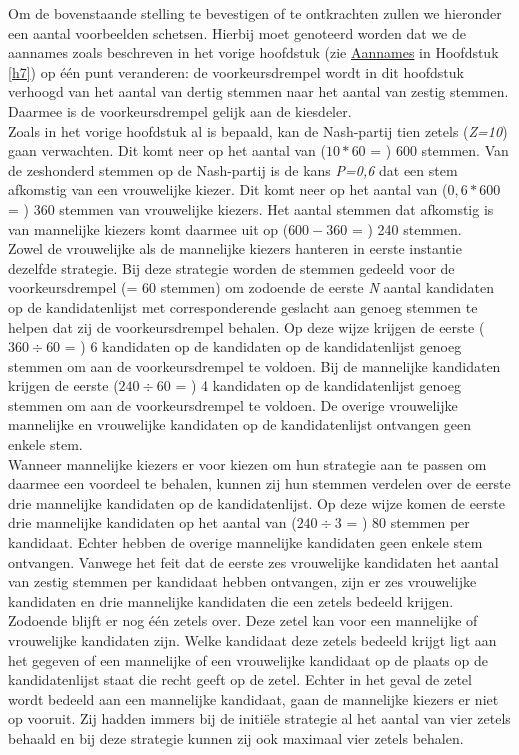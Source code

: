 Om de bovenstaande stelling te bevestigen of te ontkrachten zullen we hieronder een aantal voorbeelden schetsen. Hierbij moet genoteerd worden dat we de aannames zoals beschreven in het vorige hoofdstuk (zie \hyperref[aannamesNash]{Aannames} in Hoofdstuk \ref{h7}) op één punt veranderen: de voorkeursdrempel wordt in dit hoofdstuk verhoogd van het aantal van dertig stemmen naar het aantal van zestig stemmen. Daarmee is de voorkeursdrempel gelijk aan de kiesdeler. \\
\indent Zoals in het vorige hoofdstuk al is bepaald, kan de Nash-partij tien zetels (\textit{Z=10}) gaan verwachten. Dit komt neer op het aantal van ($10*60$ = ) 600 stemmen. Van de zeshonderd stemmen op de Nash-partij is de kans \textit{P=0,6} dat een stem afkomstig van een vrouwelijke kiezer. Dit komt neer op het aantal van ($0,6*600$ = ) 360 stemmen van vrouwelijke kiezers. Het aantal stemmen dat afkomstig is van mannelijke kiezers komt daarmee uit op ($600-360$ = ) 240 stemmen.\\
\indent Zowel de vrouwelijke als de mannelijke kiezers hanteren in eerste instantie dezelfde strategie. Bij deze strategie worden de stemmen gedeeld voor de voorkeursdrempel (= 60 stemmen) om zodoende de eerste \textit{N} aantal kandidaten op de kandidatenlijst met corresponderende geslacht aan genoeg stemmen te helpen dat zij de voorkeursdrempel behalen. Op deze wijze krijgen de eerste ($360\div60$ = ) 6 kandidaten op de kandidaten op de kandidatenlijst genoeg stemmen om aan de voorkeursdrempel te voldoen. Bij de mannelijke kandidaten krijgen de eerste ($240\div60$ = ) 4 kandidaten op de kandidatenlijst genoeg stemmen om aan de voorkeursdrempel te voldoen. De overige vrouwelijke mannelijke en vrouwelijke kandidaten op de kandidatenlijst ontvangen geen enkele stem. \\
\indent Wanneer mannelijke kiezers er voor kiezen om hun strategie aan te passen om daarmee een voordeel te behalen, kunnen zij hun stemmen verdelen over de eerste drie mannelijke kandidaten op de kandidatenlijst. Op deze wijze komen de eerste drie mannelijke kandidaten op het aantal van ($240\div3$ = ) 80 stemmen per kandidaat. Echter hebben de overige mannelijke kandidaten geen enkele stem ontvangen. Vanwege het feit dat de eerste zes vrouwelijke kandidaten het aantal van zestig stemmen per kandidaat hebben ontvangen, zijn er zes vrouwelijke kandidaten en drie mannelijke kandidaten die een zetels bedeeld krijgen. Zodoende blijft er nog één zetels over. Deze zetel kan voor een mannelijke of vrouwelijke kandidaten zijn. Welke kandidaat deze zetels bedeeld krijgt ligt aan het gegeven of een mannelijke of een vrouwelijke kandidaat op de plaats op de kandidatenlijst staat die recht geeft op de zetel. Echter in het geval de zetel wordt bedeeld aan een mannelijke kandidaat, gaan de mannelijke kiezers er niet op vooruit. Zij hadden immers bij de initi\"{e}le strategie al het aantal van vier zetels behaald en bij deze strategie kunnen zij ook maximaal vier zetels behalen. \\
